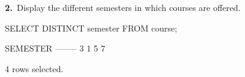 \noindent\begin{minipage}{\linewidth}
\begingroup{}
{\fontsize{14}{17}\selectfont\textbf{2.}}\ Display the different semesters in which courses are offered.\par
\endgroup\vspace{12pt}


\begin{sqlcode}
SELECT DISTINCT semester FROM course;
\end{sqlcode}

\vspace{18pt}


\begin{sqlout}[fontsize=\small]
SEMESTER
--------
       3
       1
       5
       7

4 rows selected.
\end{sqlout}
\end{minipage}\par\vspace{24pt}

